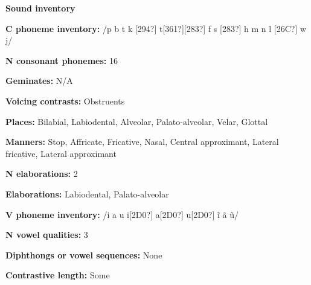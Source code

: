 \begin{styleBody}
\textbf{Sound inventory}
\end{styleBody}

\begin{styleBody}
\textbf{C phoneme inventory:} /p b t k [294?] t[361?][283?] f s [283?] h m n l [26C?] w j/
\end{styleBody}

\begin{styleBody}
\textbf{N consonant phonemes:} 16
\end{styleBody}

\begin{styleBody}
\textbf{Geminates:} N/A
\end{styleBody}

\begin{styleBody}
\textbf{Voicing contrasts:} Obstruents
\end{styleBody}

\begin{styleBody}
\textbf{Places:} Bilabial, Labiodental, Alveolar, Palato-alveolar, Velar, Glottal
\end{styleBody}

\begin{styleBody}
\textbf{Manners:} Stop, Affricate, Fricative, Nasal, Central approximant, Lateral fricative, Lateral approximant
\end{styleBody}

\begin{styleBody}
\textbf{N elaborations:} 2
\end{styleBody}

\begin{styleBody}
\textbf{Elaborations:} Labiodental, Palato-alveolar
\end{styleBody}

\begin{styleBody}
\textbf{V phoneme inventory:} /i a u i[2D0?] a[2D0?] u[2D0?] \~{i} \~{a} \~{u}/
\end{styleBody}

\begin{styleBody}
\textbf{N vowel qualities:} 3
\end{styleBody}

\begin{styleBody}
\textbf{Diphthongs or vowel sequences:} None
\end{styleBody}

\begin{styleBody}
\textbf{Contrastive length:} Some
\end{styleBody}

